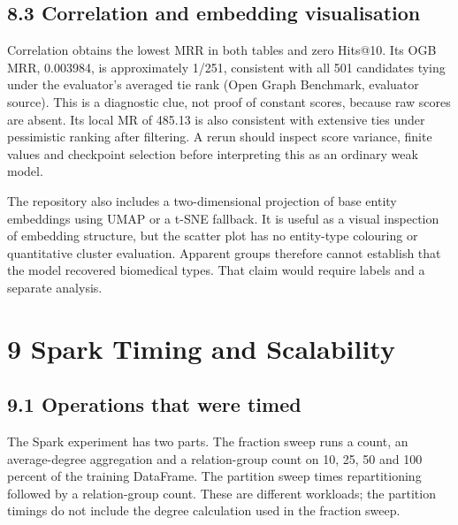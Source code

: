 \documentclass[11pt]{article}
\begin{document}
\subsection*{8.3 Correlation and embedding visualisation}
Correlation obtains the lowest MRR in both tables and zero Hits@10. Its OGB MRR, 0.003984, is approximately 1/251, consistent with all 501 candidates tying under the evaluator's averaged tie rank (Open Graph Benchmark, evaluator source). This is a diagnostic clue, not proof of constant scores, because raw scores are absent. Its local MR of 485.13 is also consistent with extensive ties under pessimistic ranking after filtering. A rerun should inspect score variance, finite values and checkpoint selection before interpreting this as an ordinary weak model.

The repository also includes a two-dimensional projection of base entity embeddings using UMAP or a t-SNE fallback. It is useful as a visual inspection of embedding structure, but the scatter plot has no entity-type colouring or quantitative cluster evaluation. Apparent groups therefore cannot establish that the model recovered biomedical types. That claim would require labels and a separate analysis.

\section*{9 Spark Timing and Scalability}
\subsection*{9.1 Operations that were timed}
The Spark experiment has two parts. The fraction sweep runs a count, an average-degree aggregation and a relation-group count on 10, 25, 50 and 100 percent of the training DataFrame. The partition sweep times repartitioning followed by a relation-group count. These are different workloads; the partition timings do not include the degree calculation used in the fraction sweep.
\end{document}
